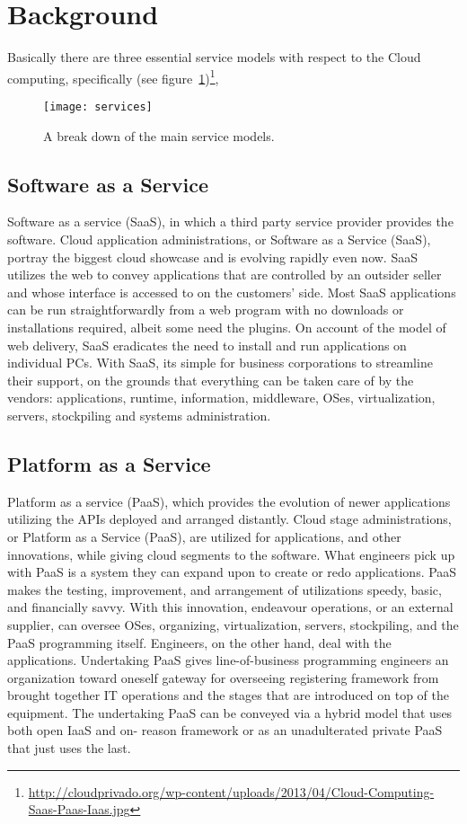 \section{Background}
\label{background}

Basically there are three essential service models with respect to the Cloud computing,
specifically (see figure~\ref{services_figure})\footnote{\url{http://cloudprivado.org/wp-content/uploads/2013/04/Cloud-Computing-Saas-Paas-Iaas.jpg}},

\begin{figure}
  \centering
    \texttt{[image: services]}
  \caption{A break down of the main service models.}
  \label{services_figure}
\end{figure}

\subsection{Software as a Service}
Software as a service (SaaS), in which a third party service provider provides the
software.
Cloud application administrations, or Software as a Service (SaaS), portray the biggest
cloud showcase and is evolving rapidly even now. SaaS utilizes the web to convey
applications that are controlled by an outsider seller and whose interface is accessed to
on the customers' side. Most SaaS applications can be run straightforwardly from a web
program with no downloads or installations required, albeit some need the plugins.
On account of the model of web delivery, SaaS eradicates the need to install and run
applications on individual PCs. With SaaS, its simple for business corporations to
streamline their support, on the grounds that everything can be taken care of by the
vendors: applications, runtime, information, middleware, OSes, virtualization, servers,
stockpiling and systems administration.
\subsection{Platform as a Service}
Platform as a service (PaaS), which provides the evolution of newer applications utilizing
the APIs deployed and arranged distantly.
Cloud stage administrations, or Platform as a Service (PaaS), are utilized for applications,
and other innovations, while giving cloud segments to the software. What engineers
pick up with PaaS is a system they can expand upon to create or redo applications. PaaS
makes the testing, improvement, and arrangement of utilizations speedy, basic, and
financially savvy. With this innovation, endeavour operations, or an external supplier,
can oversee OSes, organizing, virtualization, servers, stockpiling, and the PaaS
programming itself. Engineers, on the other hand, deal with the applications.
Undertaking PaaS gives line-of-business programming engineers an organization toward
oneself gateway for overseeing registering framework from brought together IT
operations and the stages that are introduced on top of the equipment. The
undertaking PaaS can be conveyed via a hybrid model that uses both open IaaS and on-
reason framework or as an unadulterated private PaaS that just uses the last.
